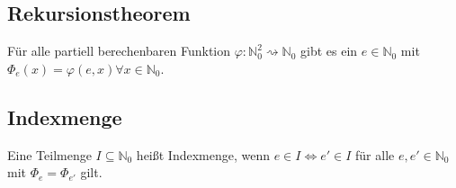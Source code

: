 \subsection{Rekursionstheorem}
    Für alle partiell berechenbaren Funktion \(\varphi:\mathbb{N}_0^2\rightsquigarrow\mathbb{N}_0\) gibt es ein 
    \(e\in\mathbb{N}_0\) mit \(\Phi_e(x)=\varphi(e,x)\forall x\in\mathbb{N}_0\).
\subsection{Indexmenge}
    Eine Teilmenge \(I\subseteq\mathbb{N}_0\) heißt Indexmenge, wenn \(e\in I\Leftrightarrow e'\in I\)
    für alle \(e,e'\in\mathbb{N}_0\) mit \(\Phi_e=\Phi_{e'}\) gilt.